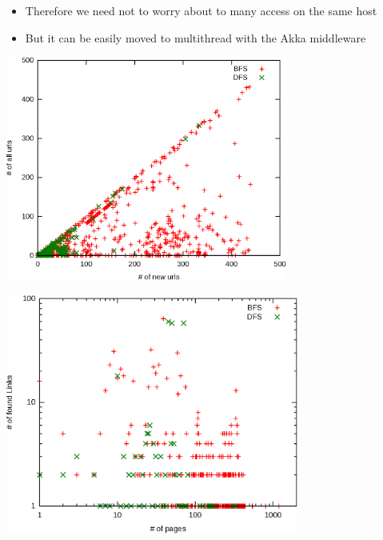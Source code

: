 \begin{frame}[c]
	\begin{itemize}
		\begin{itemize}
			\item Therefore we need not to worry about to many access on the same host
			\item But it can be easily moved to multithread with the Akka middleware
		\end{itemize}
	\end{itemize}
\end{frame}

\begin{frame}[c]
	\includegraphics[width=25em]{../crawler/src/main/resources/results/bfs/newVsFoundUrls.eps} 
\end{frame}

\begin{frame}[c]
	\includegraphics[width=26em]{../crawler/src/main/resources/results/bfs/histogram.eps} 
\end{frame}

